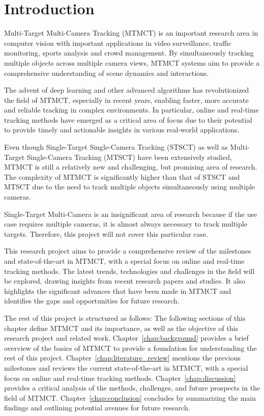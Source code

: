 \chapter{Introduction}\label{chap:introduction}
Multi-Target Multi-Camera Tracking (MTMCT) is an important research area in computer vision with important applications in video surveillance, traffic monitoring, sports analysis and crowd management. By simultaneously tracking multiple objects across multiple camera views, MTMCT systems aim to provide a comprehensive understanding of scene dynamics and interactions.

The advent of deep learning and other advanced algorithms has revolutionized the field of MTMCT, especially in recent years, enabling faster, more accurate and reliable tracking in complex environments. In particular, online and real-time tracking methods have emerged as a critical area of focus due to their potential to provide timely and actionable insights in various real-world applications.

Even though Single-Target Single-Camera Tracking (STSCT) as well as Multi-Target Single-Camera Tracking (MTSCT) have been extensively studied, MTMCT is still a relatively new and challenging, but promising area of research. The complexity of MTMCT is significantly higher than that of STSCT and MTSCT due to the need to track multiple objects simultaneously using multiple cameras.

Single-Target Multi-Camera is an insignificant area of research because if the use case requires multiple cameras, it is almost always necessary to track multiple targets. Therefore, this project will not cover this particular case.

This research project aims to provide a comprehensive review of the milestones and state-of-the-art in MTMCT, with a special focus on online and real-time tracking methods. The latest trends, technologies and challenges in the field will be explored, drawing insights from recent research papers and studies. It also highlights the significant advances that have been made in MTMCT and identifies the gaps and opportunities for future research.

The rest of this project is structured as follows: The following sections of this chapter define MTMCT and its importance, as well as the objective of this research project and related work. Chapter~\ref{chap:background} provides a brief overview of the basics of MTMCT to provide a foundation for understanding the rest of this project. Chapter~\ref{chap:literature_review} mentions the previous milestones and reviews the current state-of-the-art in MTMCT, with a special focus on online and real-time tracking methods. Chapter~\ref{chap:discussion} provides a critical analysis of the methods, challenges, and future prospects in the field of MTMCT. Chapter~\ref{chap:conclusion} concludes by summarizing the main findings and outlining potential avenues for future research.

